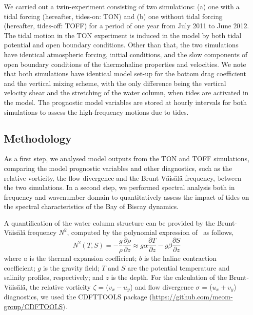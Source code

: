 \documentclass[jmse,article,accept,moreauthors,pdftex]{Definitions/mdpi}
\begin{document}
We carried out a twin-experiment consisting of two simulations: (a) one with a tidal forcing (hereafter, tides-on: TON) and (b) one without tidal forcing (hereafter, tides-off: TOFF) for a period of one year from July 2011 to June 2012. The tidal motion in the TON experiment is induced in the model by both tidal potential and open boundary conditions. Other than that, the two simulations have identical atmospheric forcing, initial conditions, and the slow components of open boundary conditions of the thermohaline properties and velocities. We note that both simulations have identical model set-up for the bottom drag coefficient and the vertical mixing scheme, with the only difference being the vertical velocity shear and the stretching of the water column, when tides are activated in the model. The prognostic model variables are stored at hourly intervals for both simulations to assess the high-frequency motions due to tides.

\subsection{Methodology}
\label{section:2.3}

As a first step, we analysed model outputs from the TON and TOFF simulations, comparing the model prognostic variables and other diagnostics, such as the relative vorticity, the flow divergence and the Brunt-V\"ais\"al\"a frequency, between the two simulations. In a second step, we performed spectral analysis both in frequency and wavenumber domain to quantitatively assess the impact of tides on the spectral characteristics of the Bay of Biscay dynamics.

A quantification of the water column structure can be provided by the Brunt-V\"ais\"al\"a frequency $N^2$, computed by the polynomial expression of~\cite{McDougall1987} as follows,
\begin{equation}
N^2(T,S) = -\frac{g}{\rho}\frac{\partial \rho}{\partial z} \approx g\alpha\frac{\partial T}{\partial z} -g\beta\frac{\partial S}{\partial z}
\label{eq:bn2}
\end{equation}
where $a$ is the thermal expansion coefficient; $b$ is the haline contraction coefficient; $g$ is the gravity field; $T$ and $S$ are the potential temperature and salinity profiles, respectively; and $z$ is the depth. For the calculation of the Brunt-V\"ais\"al\"a, the relative vorticity $\zeta$ = ($v_{x} - u_{y}$) and flow divergence $\sigma$ = ($u_{x} + v_{y}$) diagnostics, we used the CDFTTOOLS package (\url{https://github.com/meom-group/CDFTOOLS}). 
\end{document}
